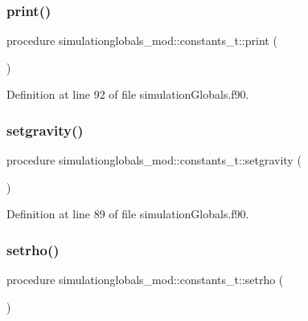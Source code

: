 \subsubsection{\texorpdfstring{print()}{print()}}
{\footnotesize\ttfamily procedure simulationglobals\+\_\+mod\+::constants\+\_\+t\+::print (\begin{DoxyParamCaption}{ }\end{DoxyParamCaption})\hspace{0.3cm}{\ttfamily [private]}}



Definition at line 92 of file simulation\+Globals.\+f90.

\mbox{\label{structsimulationglobals__mod_1_1constants__t_aac39b1720d2d3f9a7497c69f83694c9a}} 
\subsubsection{\texorpdfstring{setgravity()}{setgravity()}}
{\footnotesize\ttfamily procedure simulationglobals\+\_\+mod\+::constants\+\_\+t\+::setgravity (\begin{DoxyParamCaption}{ }\end{DoxyParamCaption})\hspace{0.3cm}{\ttfamily [private]}}



Definition at line 89 of file simulation\+Globals.\+f90.

\mbox{\label{structsimulationglobals__mod_1_1constants__t_a8c3a9d4776bce5b6e7ae475bd7711f0b}} 
\subsubsection{\texorpdfstring{setrho()}{setrho()}}
{\footnotesize\ttfamily procedure simulationglobals\+\_\+mod\+::constants\+\_\+t\+::setrho (\begin{DoxyParamCaption}{ }\end{DoxyParamCaption})\hspace{0.3cm}{\ttfamily [private]}}



